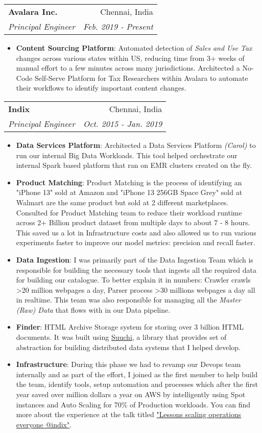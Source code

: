 \documentclass[letterpaper,11pt]{article}
\makeatletter
\newcommand{\resumeItem}[2]{
  \item\small{
    \textbf{#1}{: #2 \vspace{-2pt}}
  }
}
\newcommand{\resumeSubheading}[4]{
  \vspace{-1pt}\item
    \begin{tabular*}{0.97\textwidth}[t]{l@{\extracolsep{\fill}}r}
      \textbf{#1} & #2 \\
      \textit{\small#3} & \textit{\small #4} \\
    \end{tabular*}\vspace{-5pt}
}
\newcommand{\resumeItemListStart}{\begin{itemize}}
\newcommand{\resumeItemListEnd}{\end{itemize}\vspace{-5pt}}
\makeatother
\begin{document}
    \resumeSubheading
      {Avalara Inc.}{Chennai, India}
      {Principal Engineer}{Feb. 2019 - Present}
      \resumeItemListStart
        \resumeItem{Content Sourcing Platform}
          {
            Automated detection of \textit{Sales and Use Tax} changes across various states within US, reducing time from 3+ weeks of manual
            effort to a few minutes across many jurisdictions. Architected a No-Code Self-Serve Platform for Tax Researchers within Avalara
            to automate their workflows to identify important content changes.
          }
      \resumeItemListEnd

    \resumeSubheading
      {Indix}{Chennai, India}
      {Principal Engineer}{Oct. 2015 - Jan. 2019}
      \resumeItemListStart
        \resumeItem{Data Services Platform}
          {
            Architected a Data Services Platform \textit{(Carol)} to run our internal Big Data Workloads. This tool helped orchestrate our
            internal Spark based platform that ran on EMR clusters created on the fly.
          }
          \resumeItem{Product Matching}
          {
            Product Matching is the process of identifying an "iPhone 13" sold at Amazon and "iPhone 13 256GB Space Grey" sold at Walmart are the same product but sold at 2 different marketplaces. Consulted for Product Matching team to reduce their workload runtime across 2+ Billion product dataset from multiple days to about 7 - 8 hours. This saved us a lot in Infrastructure costs and also allowed us to run various experiments faster to improve our model metrics: precision and recall faster.
          }
          \resumeItem{Data Ingestion}
          {
            I was primarily part of the Data Ingestion Team which is responsible for building the necessary tools that ingests all the required data for building our catalogue. To better explain it in numbers: Crawler crawls >20 million webpages a day, Parser process >30 millions webpages a day all in realtime. This team was also responsible for managing all the \textit{Master (Raw) Data} that flows with in our Data pipeline.
          }
        \resumeItem{Finder}
          {
            HTML Archive Storage system for storing over 3 billion HTML documents. It was built using \href{https://github.com/ashwanthkumar/suuchi}{Suuchi}, a library that provides set of abstraction for building distributed data systems that I helped develop.
          }
          \resumeItem{Infrastructure}
          {
            During this phase we had to revamp our Devops team internally and as part of the effort, I joined as the first member to help build the team, identify tools, setup automation and processes which after the first year saved over million dollars a year on AWS by intelligently using Spot instances and Auto Scaling for 70\% of Production workloads.
            You can find more about the experience at the talk titled \href{https://speakerdeck.com/ashwanthkumar/lessons-scaling-operations-to-everyone-at-indix}{"Lessons scaling operations everyone @indix"}.
          }
      \resumeItemListEnd
\end{document}

